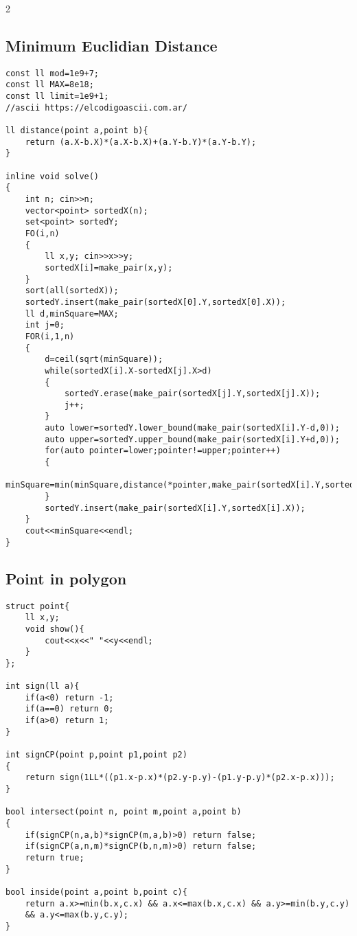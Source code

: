 \documentclass[10pt]{article}
\begin{document}
\begin{multicols*}{2}
\subsection{Minimum Euclidian Distance}
\begin{lstlisting}[style=compactcpp]
const ll mod=1e9+7;
const ll MAX=8e18;
const ll limit=1e9+1;
//ascii https://elcodigoascii.com.ar/

ll distance(point a,point b){
    return (a.X-b.X)*(a.X-b.X)+(a.Y-b.Y)*(a.Y-b.Y);
}

inline void solve()
{
    int n; cin>>n;
    vector<point> sortedX(n);
    set<point> sortedY;
    FO(i,n)
    {
        ll x,y; cin>>x>>y;
        sortedX[i]=make_pair(x,y);
    }
    sort(all(sortedX));
    sortedY.insert(make_pair(sortedX[0].Y,sortedX[0].X));
    ll d,minSquare=MAX;
    int j=0;
    FOR(i,1,n)
    {
        d=ceil(sqrt(minSquare));
        while(sortedX[i].X-sortedX[j].X>d)
        {
            sortedY.erase(make_pair(sortedX[j].Y,sortedX[j].X));
            j++;
        }
        auto lower=sortedY.lower_bound(make_pair(sortedX[i].Y-d,0));
        auto upper=sortedY.upper_bound(make_pair(sortedX[i].Y+d,0));
        for(auto pointer=lower;pointer!=upper;pointer++)
        {
            minSquare=min(minSquare,distance(*pointer,make_pair(sortedX[i].Y,sortedX[i].X)));
        }
        sortedY.insert(make_pair(sortedX[i].Y,sortedX[i].X));
    }
    cout<<minSquare<<endl;
}

\end{lstlisting}
\subsection{Point in polygon}
\begin{lstlisting}[style=compactcpp]
struct point{
    ll x,y;
    void show(){
        cout<<x<<" "<<y<<endl;
    }
};

int sign(ll a){
    if(a<0) return -1;
    if(a==0) return 0;
    if(a>0) return 1;
}

int signCP(point p,point p1,point p2)
{
    return sign(1LL*((p1.x-p.x)*(p2.y-p.y)-(p1.y-p.y)*(p2.x-p.x)));
}

bool intersect(point n, point m,point a,point b)
{
    if(signCP(n,a,b)*signCP(m,a,b)>0) return false;
    if(signCP(a,n,m)*signCP(b,n,m)>0) return false;
    return true;
}

bool inside(point a,point b,point c){
    return a.x>=min(b.x,c.x) && a.x<=max(b.x,c.x) && a.y>=min(b.y,c.y)
    && a.y<=max(b.y,c.y);
}


\end{lstlisting}
\end{multicols*}
\end{document}

